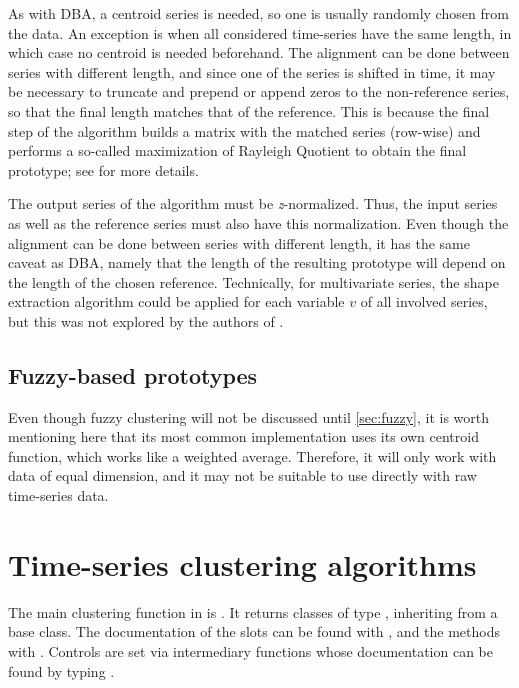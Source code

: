 As with DBA, a centroid series is needed,
so one is usually randomly chosen from the data.
An exception is when all considered time-series have the same length,
in which case no centroid is needed beforehand.
The alignment can be done between series with different length,
and since one of the series is shifted in time,
it may be necessary to truncate and prepend or append zeros to the non-reference series,
so that the final length matches that of the reference.
This is because the final step of the algorithm builds a matrix with the matched series (row-wise) and performs a so-called maximization of Rayleigh Quotient to obtain the final prototype;
see \citet{paparrizos2015} for more details.

The output series of the algorithm must be \textit{z}-normalized.
Thus, the input series as well as the reference series must also have this normalization.
Even though the alignment can be done between series with different length,
it has the same caveat as DBA,
namely that the length of the resulting prototype will depend on the length of the chosen reference.
Technically, for multivariate series,
the shape extraction algorithm could be applied for each variable $v$ of all involved series,
but this was not explored by the authors of \kshape{}.

\subsection{Fuzzy-based prototypes}
\label{sec:fuzzy-cent}

Even though fuzzy clustering will not be discussed until \cref{sec:fuzzy},
it is worth mentioning here that its most common implementation uses its own centroid function,
which works like a weighted average.
Therefore, it will only work with data of equal dimension,
and it may not be suitable to use directly with raw time-series data.

\section{Time-series clustering algorithms}
\label{sec:clustering}

The main clustering function in \dtwclust{} is .
It returns classes of type ,
inheriting from a base  class.
The documentation of the slots can be found with ,
and the methods with .
Controls are set via intermediary functions whose documentation can be found by typing .

